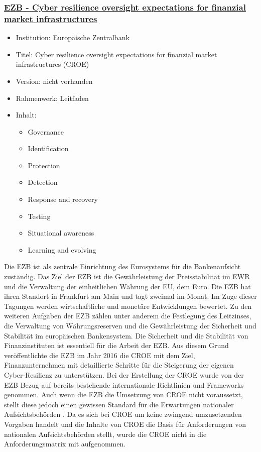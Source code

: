
\subsubsection{\underline{EZB - Cyber resilience oversight expectations for finanzial market infrastructures}}
\begin{itemize}
    \item Institution: Europäische Zentralbank 
    \item Titel: Cyber resilience oversight expectations for finanzial market infrastructures (CROE) \autocite{CROE}
    \item Version: nicht vorhanden
    \item Rahmenwerk: Leitfaden
    \item Inhalt: 
    \begin{itemize}
        \item Governance
        \item Identification
        \item Protection
        \item Detection
        \item Response and recovery
        \item Testing
        \item Situational awareness
        \item Learning and evolving
    \end{itemize}
\end{itemize}
\bigbreak
Die EZB ist als zentrale Einrichtung des Eurosystems für die Bankenaufsicht zuständig. Das Ziel der EZB ist die Gewährleistung der Preisstabilität im EWR und die Verwaltung der einheitlichen Währung der EU, dem Euro. Die EZB hat ihren Standort in Frankfurt am Main und tagt zweimal im Monat. Im Zuge dieser Tagungen werden wirtschaftliche und monetäre Entwicklungen bewertet. 
Zu den weiteren Aufgaben der EZB zählen unter anderem die Festlegung des Leitzinses, die Verwaltung von Währungsreserven und die Gewährleistung der Sicherheit und Stabilität im europäischen Bankensystem. \autocite{EZB}
\bigbreak
Die Sicherheit und die Stabilität von Finanzinstituten ist essentiell für die Arbeit der EZB. Aus diesem Grund veröffentlichte die EZB im Jahr 2016 die CROE mit dem Ziel, Finanzunternehmen mit detaillierte Schritte für die Steigerung der eigenen Cyber-Resilienz zu unterstützen. Bei der Erstellung der CROE wurde von der EZB Bezug auf bereits bestehende internationale Richtlinien und Frameworks genommen. Auch wenn die EZB die Umsetzung von CROE nicht voraussetzt, stellt diese jedoch einen gewissen Standard für die Erwartungen nationaler Aufsichtsbehörden \autocite{CROE}. Da es sich bei CROE um keine zwingend umzusetzenden Vorgaben handelt und die Inhalte von CROE die Basis für Anforderungen von nationalen Aufsichtsbehörden stellt, wurde die CROE nicht in die Anforderungsmatrix mit aufgenommen. 

